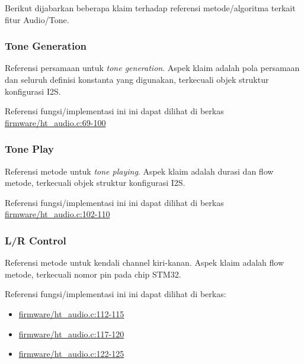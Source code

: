 \documentclass[12pt,]{article}
\begin{document}
	Berikut dijabarkan beberapa klaim terhadap referensi metode/algoritma terkait fitur Audio/Tone.
	
	\subsubsection{Tone Generation}
	
	Referensi persamaan untuk \textit{tone generation}.
	Aspek klaim adalah pola persamaan dan seluruh definisi konstanta yang digunakan,
	terkecuali objek struktur konfigurasi I2S.
	
	Referensi fungsi/implementasi ini ini dapat dilihat di berkas
	\href{https://github.com/VibrasticLab/pikoakustik/blob/stm32f401re_3pin/firmware/ht_audio.c#L69-L100}{firmware/ht\_audio.c:69-100}

	\subsubsection{Tone Play}
	
	Referensi metode untuk \textit{tone playing}.
	Aspek klaim adalah durasi dan flow metode, terkecuali objek struktur konfigurasi I2S.

	Referensi fungsi/implementasi ini ini dapat dilihat di berkas
	\href{https://github.com/VibrasticLab/pikoakustik/blob/stm32f401re_3pin/firmware/ht_audio.c#L102-L110}{firmware/ht\_audio.c:102-110}

	\subsubsection{L/R Control}
	
	Referensi metode untuk kendali channel kiri-kanan.
	Aspek klaim adalah flow metode, terkecuali nomor pin pada chip STM32.
	
	Referensi fungsi/implementasi ini ini dapat dilihat di berkas:
	\begin{itemize}
		\item \href{https://github.com/VibrasticLab/pikoakustik/blob/stm32f401re_3pin/firmware/ht_audio.c#L112-L115}{firmware/ht\_audio.c:112-115}
		\item \href{https://github.com/VibrasticLab/pikoakustik/blob/stm32f401re_3pin/firmware/ht_audio.c#L117-L120}{firmware/ht\_audio.c:117-120}
		\item \href{https://github.com/VibrasticLab/pikoakustik/blob/stm32f401re_3pin/firmware/ht_audio.c#L122-L125}{firmware/ht\_audio.c:122-125}
	\end{itemize}
	
\end{document}
